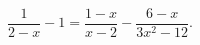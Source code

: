 \begin{ex}[type=equation]
	\begin{condition}
		$\dfrac{1}{2 - x} - 1 = \dfrac{1 - x}{x - 2} - \dfrac{6 - x}{3 x^2 - 12}.$
	\end{condition}
\end{ex}